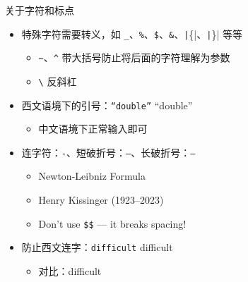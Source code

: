\begin{frame}[fragile]{关于字符和标点}
\begin{itemize}
    \item 特殊字符需要转义，如 \texttt{\_}、\texttt{\%}、\texttt{\$}、\texttt{\&}、\texttt|\{|、\texttt|\}| 等等
    \begin{itemize}
        \item \texttt{\~{}}、\texttt{\^{}} 带大括号防止将后面的字符理解为参数
        \item \texttt{\textbackslash} 反斜杠
    \end{itemize}
    \item 西文语境下的引号：\texttt{``double''} \quad ``double''
    \begin{itemize}
        \item 中文语境下正常输入即可
    \end{itemize}
    \item 连字符：\texttt{-}、短破折号：\texttt{--}、长破折号：\texttt{---}
    \begin{itemize}
        \item Newton-Leibniz Formula
        \item Henry Kissinger (1923--2023)
        \item Don't use \texttt{\$\$} --- it breaks spacing!
    \end{itemize}
    \item 防止西文连字：\texttt{dif{}f{}icult} \quad dif{}f{}icult
    \begin{itemize}
        \item 对比：difficult
    \end{itemize}
\end{itemize}
\end{frame}
  
